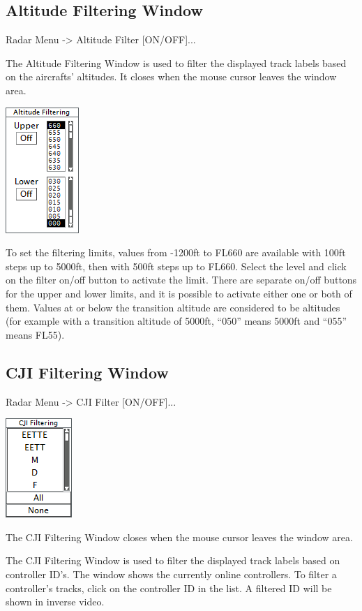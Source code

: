 \documentclass[11pt,a4paper]{memoir}
\begin{document}
\subsection{Altitude Filtering Window}
\label{win:afw}

Radar Menu -> Altitude Filter [ON/OFF]...

The Altitude Filtering Window is used to filter the displayed track labels based on the aircrafts’ altitudes. It closes when the mouse cursor leaves the window area.

\includegraphics{img/altfil.png}

To set the filtering limits, values from -1200ft to FL660 are available with 100ft steps up to 5000ft, then with 500ft steps up to FL660. Select the level and click on the filter on/off button to activate the limit. There are separate on/off buttons for the upper and lower limits, and it is possible to activate either one or both of them. Values at or below the transition altitude are considered to be altitudes (for example with a transition altitude of 5000ft, “050” means 5000ft and “055” means FL55).

\subsection{CJI Filtering Window}
\label{win:cji}

Radar Menu -> CJI Filter [ON/OFF]...

\includegraphics{img/cji.png}

The CJI Filtering Window closes when the mouse cursor leaves the window area.

The CJI Filtering Window is used to filter the displayed track labels based on controller ID’s. The window shows the currently online controllers. To filter a controller’s tracks, click on the controller ID in the list. A filtered ID will be shown in inverse video.
\end{document}
